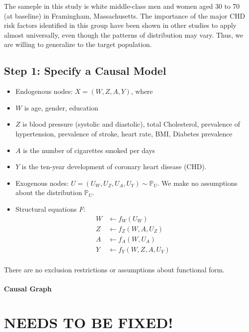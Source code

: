 \documentclass[]{article}
\let\oldparagraph\paragraph
\renewcommand{\paragraph}[1]{\oldparagraph{#1}\mbox{}}
\begin{document}
The sameple in this study is white middle-class men and women aged 30 to
70 (at baseline) in Framingham, Massachusetts. The importance of the
major CHD risk factors identified in this group have been shown in other
studies to apply almost universally, even though the patterns of
distribution may vary. Thus, we are willing to generalize to the target
population.

\subsection{Step 1: Specify a Causal
Model}\label{step-1-specify-a-causal-model}

\begin{itemize}
\item
  Endogenous nodes: \(X = (W,Z,A,Y)\), where
\item
  \(W\) is age, gender, education
\item
  \(Z\) is blood pressure (systolic and diastolic), total Cholesterol,
  prevalence of hypertension, prevalence of stroke, heart rate, BMI,
  Diabetes prevalence
\item
  \(A\) is the number of cigarettes smoked per days
\item
  \(Y\) is the ten-year development of coronary heart disease (CHD).
\item
  Exogenous nodes: \(U = (U_{W}, U_{Z}, U_A , U_Y) \sim \mathbb{P}_U\).
  We make no assumptions about the distribution \(\mathbb{P}_U\).
\item
  Structural equations \(F\): \[
  \begin{aligned}
  W &\leftarrow  f_W (U_W) \\
  Z  &\leftarrow  f_Z (W, A, U_Z) \\
  A  &\leftarrow  f_A (W, U_A) \\
  Y  &\leftarrow  f_Y (W, Z, A, U_Y) \\
  \end{aligned}
  \]
\end{itemize}

There are no exclusion restrictions or assumptions about functional
form.

\paragraph{Causal Graph}\label{causal-graph}

\section{NEEDS TO BE FIXED!}\label{needs-to-be-fixed}
\end{document}
